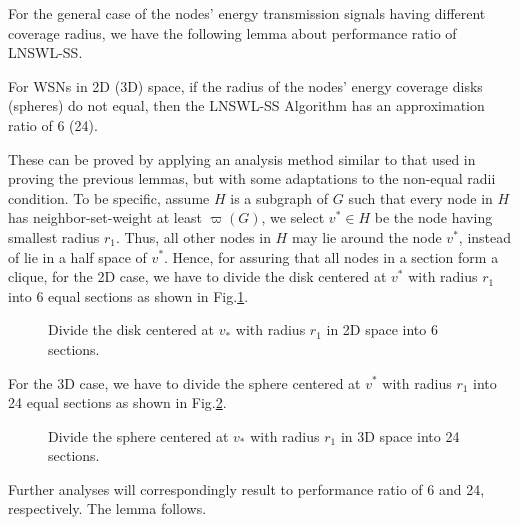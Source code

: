 \documentclass[journal,10pt]{IEEEtran}
\begin{document}
For the general case of the nodes' energy transmission signals having different coverage radius, we have the following lemma about performance ratio of LNSWL-SS.

\begin{lemma}
\label{lemma_2d3d_ratio}
For WSNs in 2D (3D) space, if the radius of the nodes' energy coverage disks (spheres) do not equal, then the LNSWL-SS Algorithm has an approximation ratio of 6 (24).
\end{lemma}

\begin{IEEEproof}
These can be proved by applying an analysis method similar to that used in proving the previous lemmas, but with some adaptations to the non-equal radii condition. To be specific, assume $H$ is a subgraph of $G$ such that every node in $H$ has neighbor-set-weight at least $\varpi(G)$, we select $v^{*}{\in}H$ be the node having smallest radius $r_1$. Thus, all other nodes in $H$ may lie around the node $v^{*}$, instead of lie in a half space of $v^{*}$. Hence, for assuring that all nodes in a section form a clique, for the 2D case, we have to divide the disk centered at $v^{*}$ with radius $r_1$ into 6 equal sections as shown in Fig.\ref{fig_2d6part}.

\begin{figure}[htb]
\caption{Divide the disk centered at $v_{*}$ with radius $r_1$ in 2D space into 6 sections.}
\label{fig_2d6part}
\end{figure}

For the 3D case, we have to divide the sphere centered at $v^{*}$ with radius $r_1$ into 24 equal sections as shown in Fig.\ref{fig_3d24part}.

\begin{figure}[htb]
\caption{Divide the sphere centered at $v_{*}$ with radius $r_1$ in 3D space into 24 sections.}
\label{fig_3d24part}
\end{figure}

Further analyses will correspondingly result to performance ratio of 6 and 24, respectively. The lemma follows.

\end{IEEEproof}
\end{document}
